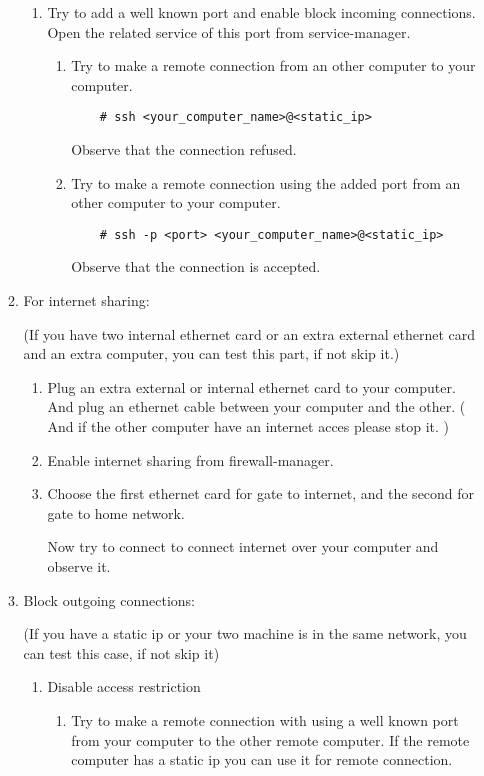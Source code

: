 \documentclass[a4paper,10pt]{article}
\begin{document}
\begin{enumerate}
\begin{enumerate}
\begin{enumerate}
        \item Try to add a well known port and enable block incoming connections.
            Open the related service of this port from service-manager.

        \begin{enumerate}
            \item Try to make a remote connection from an other computer to your computer.
	\begin{verbatim}
	# ssh <your_computer_name>@<static_ip>
	\end{verbatim}
	Observe that the connection refused.

            \item Try to make a remote connection using the added port from an other computer to your computer.
	\begin{verbatim}
	# ssh -p <port> <your_computer_name>@<static_ip>
	\end{verbatim}
                 Observe that the connection is accepted.
        \end{enumerate}
    \end{enumerate}
    \item For internet sharing: 

	(If you have two internal ethernet card or an extra external ethernet card and an extra computer, you can test this part, if not skip it.)
        \begin{enumerate}
        \item Plug an extra external or internal ethernet card to your computer. And plug an ethernet cable between your computer and the other. ( And if the other computer have an internet acces please stop it. )

        \item Enable internet sharing from firewall-manager.

        \item Choose the first ethernet card for gate to internet, and the second for gate to home network.

              Now try to connect to connect internet over your computer and observe it.
        \end{enumerate}
    \item Block outgoing connections:

	(If you have a static ip or your two machine is in the same network, you can test this case, if not skip it)
        \begin{enumerate}
        \item Disable access restriction
            \begin{enumerate}
            \item Try to make a remote connection with using a well known port from your computer to the other remote computer.
                If the remote computer has a static ip you can use it for remote connection. 


\end{enumerate}
\end{enumerate}
\end{enumerate}
\end{enumerate}
\end{document}
